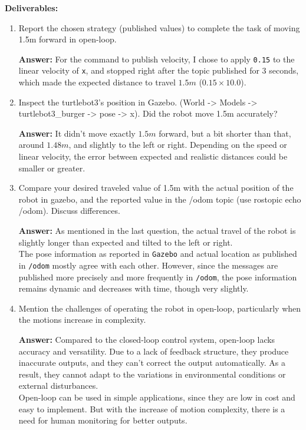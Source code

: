 \documentclass[12pt]{article}
\begin{document}
\textbf{Deliverables:}
\begin{enumerate}

    \item Report the chosen strategy (published values) to complete the task of moving 1.5m forward in open-loop.
    
    \textbf{Answer: }For the command to publish velocity, I chose to apply \texttt{0.15} to the linear velocity of \texttt{x}, and stopped right after the topic published for $3$ seconds, which made the expected distance to travel $1.5m$ ($0.15 \times 10.0$).
    
    \item Inspect the turtlebot3’s position in Gazebo. (World -> Models -> turtlebot3\_burger -> pose -> x). Did the robot move 1.5m accurately?
    
    \textbf{Answer: }It didn't move exactly $1.5m$ forward, but a bit shorter than that, around $1.48m$, and slightly to the left or right. Depending on the speed or linear velocity, the error between expected and realistic distances could be smaller or greater.
    
    \item Compare your desired traveled value of 1.5m with the actual position of the robot in gazebo, and the reported value in the /odom topic (use rostopic echo /odom). Discuss differences.
    
    \textbf{Answer: }As mentioned in the last question, the actual travel of the robot is slightly longer than expected and tilted to the left or right.
    \\The pose information as reported in \texttt{Gazebo} and actual location as published in \texttt{/odom} mostly agree with each other. However, since the messages are published more precisely and more frequently in \texttt{/odom}, the pose information remains dynamic and decreases with time, though very slightly.
  
    \item Mention the challenges of operating the robot in open-loop, particularly when the motions increase in complexity.
    
    \textbf{Answer: }Compared to the closed-loop control system, open-loop lacks accuracy and versatility. Due to a lack of feedback structure, they produce inaccurate outputs, and they can't correct the output automatically. As a result, they cannot adapt to the variations in environmental conditions or external disturbances.
    \\Open-loop can be used in simple applications, since they are low in cost and easy to implement. But with the increase of motion complexity, there is a need for human monitoring for better outputs.


\end{enumerate}
\end{document}

